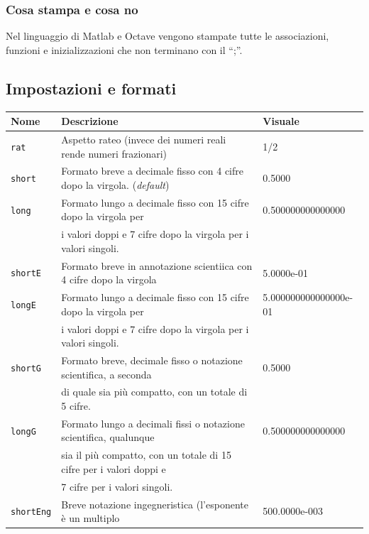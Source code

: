 \documentclass{book}
\begin{document}
\subsubsection{Cosa stampa e cosa no}
Nel linguaggio di Matlab e Octave vengono stampate tutte le associazioni,
funzioni e inizializzazioni che non terminano con il ``{\color{red};}''.

\subsection{Impostazioni e formati}
\label{sec:formImp}
\begin{table}[ht]
  \centering
  \begin{tabular}{lll}
    {\bf Nome} & {\bf Descrizione} & {\bf Visuale}\\\hline
    \lstinline|rat| & Aspetto rateo (invece dei numeri reali rende numeri frazionari) & 1/2\\\hline
    \lstinline|short| & Formato breve a decimale fisso con 4 cifre dopo la virgola. (\textit{default}) & 0.5000\\\hline
    \lstinline|long| & Formato lungo a decimale fisso con 15 cifre dopo la virgola per & 0.500000000000000\\
                     &  i valori doppi e 7 cifre dopo la virgola per i valori singoli. \\\hline
    \lstinline|shortE| & Formato breve in annotazione scientiica con 4 cifre dopo la virgola & 5.0000e-01\\\hline
    \lstinline|longE| & Formato lungo a decimale fisso con 15 cifre dopo la virgola per & 5.000000000000000e-01\\
               & i valori doppi e 7 cifre dopo la virgola per i valori singoli.\\\hline
    \lstinline|shortG| & Formato breve, decimale fisso o notazione scientifica, a seconda & 0.5000\\ & di quale sia più compatto, con un totale di 5 cifre.\\\hline
    \lstinline|longG| & Formato lungo a decimali fissi o notazione scientifica, qualunque & 0.500000000000000\\
               & sia il più compatto, con un totale di 15 cifre per i valori doppi e\\ & 7 cifre per i valori singoli.\\\hline
    \lstinline|shortEng| & Breve notazione ingegneristica (l'esponente è un
                           multiplo & 500.0000e-003\\
    

\end{tabular}
\end{table}
\end{document}
